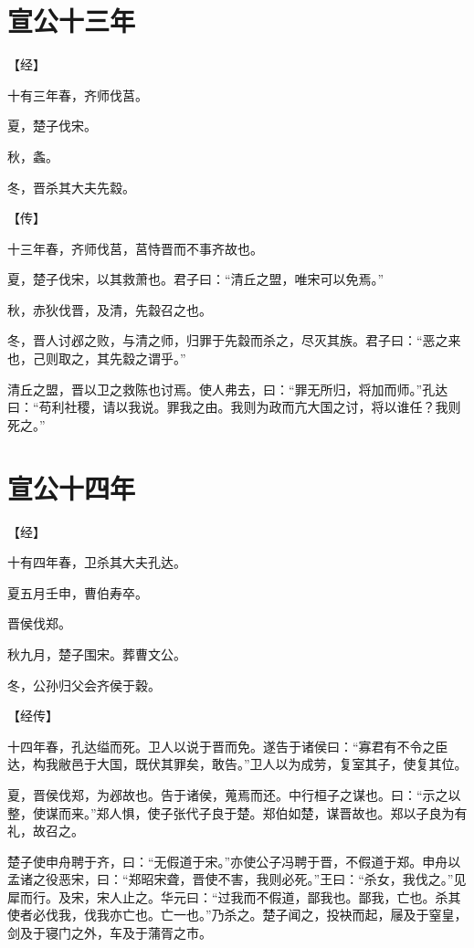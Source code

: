 \documentclass[a4paper,12pt,UTF8,twoside]{ctexbook}
\begin{document}
\chapter{宣公十三年}




【经】

十有三年春，齐师伐莒。

夏，楚子伐宋。

秋，螽。

冬，晋杀其大夫先縠。

【传】

十三年春，齐师伐莒，莒恃晋而不事齐故也。

夏，楚子伐宋，以其救萧也。君子曰：“清丘之盟，唯宋可以免焉。”

秋，赤狄伐晋，及清，先縠召之也。

冬，晋人讨邲之败，与清之师，归罪于先縠而杀之，尽灭其族。君子曰：“恶之来也，己则取之，其先縠之谓乎。”

清丘之盟，晋以卫之救陈也讨焉。使人弗去，曰：“罪无所归，将加而师。”孔达曰：“苟利社稷，请以我说。罪我之由。我则为政而亢大国之讨，将以谁任？我则死之。”


\chapter{宣公十四年}



【经】

十有四年春，卫杀其大夫孔达。

夏五月壬申，曹伯寿卒。

晋侯伐郑。

秋九月，楚子围宋。葬曹文公。

冬，公孙归父会齐侯于穀。

【经传】

十四年春，孔达缢而死。卫人以说于晋而免。遂告于诸侯曰：“寡君有不令之臣达，构我敝邑于大国，既伏其罪矣，敢告。”卫人以为成劳，复室其子，使复其位。

夏，晋侯伐郑，为邲故也。告于诸侯，蒐焉而还。中行桓子之谋也。曰：“示之以整，使谋而来。”郑人惧，使子张代子良于楚。郑伯如楚，谋晋故也。郑以子良为有礼，故召之。

楚子使申舟聘于齐，曰：“无假道于宋。”亦使公子冯聘于晋，不假道于郑。申舟以孟诸之役恶宋，曰：“郑昭宋聋，晋使不害，我则必死。”王曰：“杀女，我伐之。”见犀而行。及宋，宋人止之。华元曰：“过我而不假道，鄙我也。鄙我，亡也。杀其使者必伐我，伐我亦亡也。亡一也。”乃杀之。楚子闻之，投袂而起，屦及于窒皇，剑及于寝门之外，车及于蒲胥之市。
\end{document}
